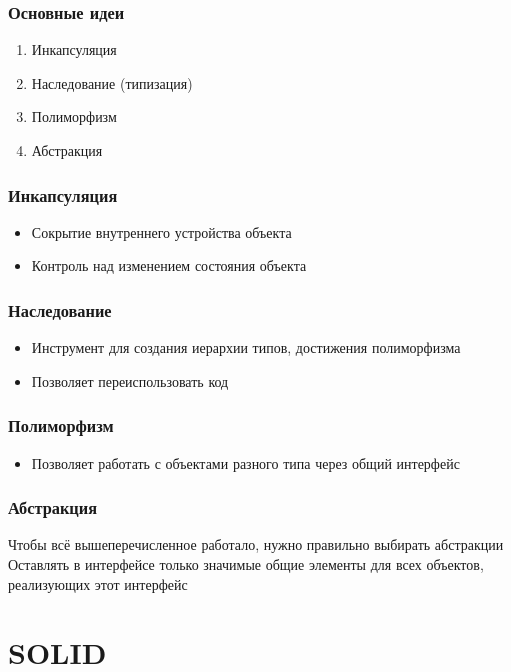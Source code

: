 \documentclass[russian,aspectratio=169,14pt]{beamer}
\begin{document}
\begin{frame}
	\frametitle{Основные идеи}
	\begin{enumerate}
		\item Инкапсуляция
		\item Наследование (типизация)
		\item Полиморфизм
		\item Абстракция
	\end{enumerate}
\end{frame}

\begin{frame}
	\frametitle{Инкапсуляция}
	\begin{itemize}
		\item Сокрытие внутреннего устройства объекта
		\item Контроль над изменением состояния объекта
	\end{itemize}
\end{frame}

\begin{frame}
	\frametitle{Наследование}
	\begin{itemize}
		\item Инструмент для создания иерархии типов, достижения полиморфизма
		\item Позволяет переиспользовать код
	\end{itemize}
\end{frame}

\begin{frame}
	\frametitle{Полиморфизм}
	\begin{itemize}
		\item Позволяет работать с объектами разного типа через общий интерфейс
	\end{itemize}
\end{frame}

\begin{frame}
	\frametitle{Абстракция}
	Чтобы всё вышеперечисленное работало, нужно правильно выбирать абстракции\\
	Оставлять в интерфейсе только значимые общие элементы для всех объектов, реализующих этот интерфейс
\end{frame}

\section{SOLID}
\end{document}
